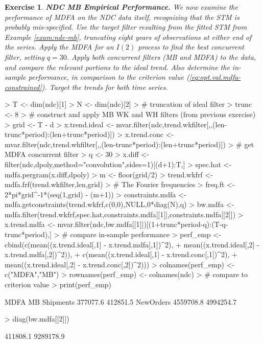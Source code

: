 \documentclass[a4paper]{book}
\newtheorem{Exercise}{Exercise}
\begin{document}
\begin{Exercise} {\bf NDC MB Empirical Performance.}  \rm
\label{exer:ndc-mb3}
 We now examine the performance of MDFA   on the NDC data itself,
 recognizing that the STM is probably mis-specified.  
 Use the target filter resulting from the  fitted STM
  from Example \ref{exam:ndc-mb}, truncating eight years of observations at either end
   of the series.  
 Apply the  MDFA  for an $I(2)$ process  to find the best
 concurrent filter, setting $q= 30$.
  Apply both concurrent filters (MB and MDFA)
 to the data, and compare the relevant portions to the ideal trend.
 Also determine the in-sample performance, in comparison to the criterion value
 (\ref{eq:opt.val.mdfa-constrained}).   Target the trends for both time series.
\end{Exercise}
     

\begin{Schunk}
\begin{Sinput}
> T <- dim(ndc)[1]
> N <- dim(ndc)[2]
> # truncation of ideal filter
> trunc <- 8
> # construct and apply MB WK and WH filters (from previous exercise)
> grid <- T - d
> x.trend.ideal <- mvar.filter(ndc,trend.wkfilter[,,(len-trunc*period):(len+trunc*period)])
> x.trend.conc <- mvar.filter(ndc,trend.whfilter[,,(len-trunc*period):(len+trunc*period)])
> # get MDFA concurrent filter
> q <- 30
> x.diff <- filter(ndc,dpoly,method="convolution",sides=1)[(d+1):T,]
> spec.hat <- mdfa.pergram(x.diff,dpoly)
> m <- floor(grid/2)
> trend.wkfrf <- mdfa.frf(trend.wkfilter,len,grid)
> # The Fourier frequencies
> freq.ft <- 2*pi*grid^{-1}*(seq(1,grid) - (m+1))
> constraints.mdfa <- mdfa.getconstraints(trend.wkfrf,c(0,0),NULL,0*diag(N),q)
> bw.mdfa <- mdfa.filter(trend.wkfrf,spec.hat,constraints.mdfa[[1]],constraints.mdfa[[2]])
> x.trend.mdfa <- mvar.filter(ndc,bw.mdfa[[1]])[(1+trunc*period-q):(T-q-trunc*period),]
> # compare in-sample performance
> perf_emp <- cbind(c(mean((x.trend.ideal[,1] - x.trend.mdfa[,1])^2),
+ 	mean((x.trend.ideal[,2] - x.trend.mdfa[,2])^2)),
+   c(mean((x.trend.ideal[,1] - x.trend.conc[,1])^2),
+ 	mean((x.trend.ideal[,2] - x.trend.conc[,2])^2)))
> colnames(perf_emp) <- c("MDFA","MB")
> rownames(perf_emp) <- colnames(ndc)
> # compare to criterion value
> print(perf_emp)
\end{Sinput}
\begin{Soutput}
               MDFA        MB
Shipments  377077.6  412851.5
NewOrders 4559708.8 4994254.7
\end{Soutput}
\begin{Sinput}
> diag(bw.mdfa[[2]])
\end{Sinput}
\begin{Soutput}
[1]  411808.1 9289178.9
\end{Soutput}
\end{Schunk}
    
\end{document}
